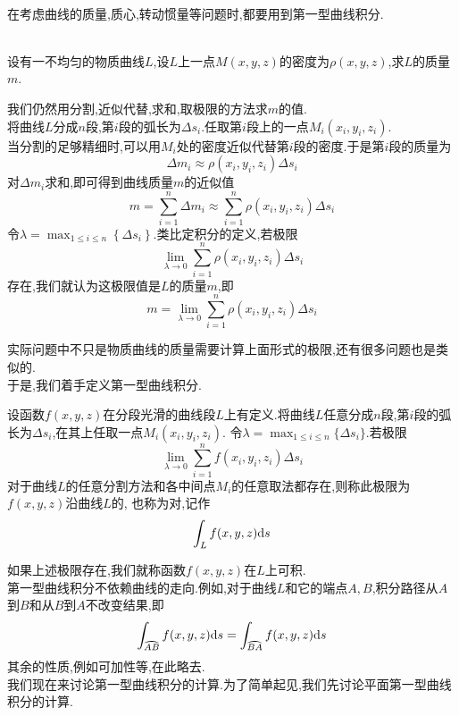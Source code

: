 \documentclass{ctexart}
\begin{document}
\pagestyle{empty}
\begin{center}\large{}\end{center}
\\
在考虑曲线的质量,质心,转动惯量等问题时,都要用到第一型曲线积分.
\begin{problem}[1.1 物质曲线的质量]
    \\设有一不均匀的物质曲线$L$,设$L$上一点$M(x,y,z)$的密度为$\rho(x,y,z)$,求$L$的质量$m$.
\end{problem}
\begin{solution}
    我们仍然用分割,近似代替,求和,取极限的方法求$m$的值.\\
    将曲线$L$分成$n$段,第$i$段的弧长为$\Delta s_i$.任取第$i$段上的一点$M_i(x_i,y_i,z_i)$.\\
    当分割的足够精细时,可以用$M_i$处的密度近似代替第$i$段的密度.于是第$i$段的质量为
    \[\Delta m_i\approx \rho(x_i,y_i,z_i)\Delta s_i\]
    对$\Delta m_i$求和,即可得到曲线质量$m$的近似值
    \[m=\sum_{i=1}^{n}\Delta m_i\approx\sum_{i=1}^{n}\rho(x_i,y_i,z_i)\Delta s_i\]
    令$\displaystyle\lambda=\max_{1\leqslant i\leqslant n}\left\{\Delta s_i\right\}$.类比定积分的定义,若极限
    \[\lim_{\lambda\to0}\sum_{i=1}^{n}\rho(x_i,y_i,z_i)\Delta s_i\]
    存在,我们就认为这极限值是$L$的质量$m$,即
    \[m=\lim_{\lambda\to0}\sum_{i=1}^{n}\rho(x_i,y_i,z_i)\Delta s_i\]
\end{solution}\noindent
实际问题中不只是物质曲线的质量需要计算上面形式的极限,还有很多问题也是类似的.\\
于是,我们着手定义第一型曲线积分.
\begin{definition}[1.2 定义:第一型曲线积分]
    设函数$f(x,y,z)$在分段光滑的曲线段$L$上有定义.将曲线$L$任意分成$n$段,第$i$段的弧长为$\Delta s_i$,在其上任取一点$M_i(x_i,y_i,z_i)$.%
    令$\displaystyle\lambda=\max_{1\leqslant i\leqslant n}\{\Delta s_i\}$.若极限
    \[\lim_{\lambda\to0}\sum_{i=1}^{n}f(x_i,y_i,z_i)\Delta s_i\]
    对于曲线$L$的任意分割方法和各中间点$M_i$的任意取法都存在,则称此极限为$f(x,y,z)$沿曲线$L$的,%
    也称为对,记作
    \[\int_{L}f(x,y,z)\mathrm{d} s\]
\end{definition}\noindent
如果上述极限存在,我们就称函数$f(x,y,z)$在$L$上可积.\\
第一型曲线积分不依赖曲线的走向.例如,对于曲线$L$和它的端点$A,B$,积分路径从$A$到$B$和从$B$到$A$不改变结果,即
\[\int_{\wideparen{AB}}f(x,y,z)\di s=\int_{\wideparen{BA}}f(x,y,z)\di s\]
其余的性质,例如可加性等,在此略去.\\
我们现在来讨论第一型曲线积分的计算.为了简单起见,我们先讨论平面第一型曲线积分的计算.
\end{document}
